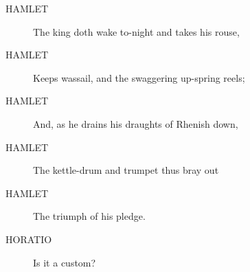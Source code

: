 \documentclass{article}
\begin{document}
\begin{description}
            
\item[HAMLET] The king doth wake to-night and takes his rouse,
\item[HAMLET] Keeps wassail, and the swaggering up-spring reels;
\item[HAMLET] And, as he drains his draughts of Rhenish down,
\item[HAMLET] The kettle-drum and trumpet thus bray out
\item[HAMLET] The triumph of his pledge.
\end{description}
          
\begin{description}
            
\item[HORATIO] Is it a custom?
\end{description}
          
\end{document}
